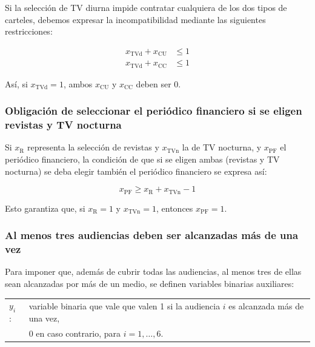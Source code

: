 Si la selección de TV diurna impide contratar cualquiera de los dos tipos de carteles, debemos expresar la incompatibilidad mediante las siguientes restricciones:

\begin{align}
x_{\text{TVd}} + x_{\text{CU}} &\leq 1 \\
x_{\text{TVd}} + x_{\text{CC}} &\leq 1
\end{align}

\noindent
Así, si $x_{\text{TVd}}=1$, ambos $x_{\text{CU}}$ y $x_{\text{CC}}$ deben ser 0.

\subsubsection{Obligación de seleccionar el periódico financiero si se eligen  revistas y TV nocturna}

Si $x_{\text{R}}$ representa la selección de revistas y $x_{\text{TVn}}$ la de TV nocturna, y $x_{\text{PF}}$ el periódico financiero, la condición de que si se eligen ambas (revistas y TV nocturna) se deba elegir también el periódico financiero se expresa así:

\begin{equation}
x_{\text{PF}} \geq x_{\text{R}} + x_{\text{TVn}} - 1
\end{equation}

\noindent
Esto garantiza que, si $x_{\text{R}}=1$ y $x_{\text{TVn}}=1$, entonces $x_{\text{PF}}=1$.



\newpage
\subsubsection{Al menos tres audiencias deben ser alcanzadas más de una vez}

Para imponer que, además de cubrir todas las audiencias, al menos tres de ellas sean alcanzadas por más de un medio, se definen variables binarias auxiliares:



\begin{tabular}{l l}
$y_i$ : & variable binaria que vale que valen 1 si la audiencia $i$ es alcanzada más de una vez, \\
& 0 en caso contrario, para $i = 1, \dots, 6$. \\
\end{tabular}


